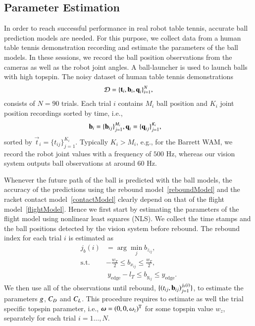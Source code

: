 \subsection{Parameter Estimation}\label{sectionEstimation}

In order to reach successful performance in real robot table tennis, accurate ball prediction models are needed. For this purpose, we collect data from a human table tennis demonstration recording and estimate the parameters of the ball models. In these sessions, we record the ball position observations from the cameras as well as the robot joint angles. A ball-launcher is used to launch balls with high topspin. The noisy dataset of human table tennis demonstrations 
%
\begin{align}
\mathcal{D} = \{\boldsymbol{\mathrm{t}}_i, \boldsymbol{\mathrm{b}}_i, \boldsymbol{\mathrm{q}}_i\}_{i=1}^{N} \label{demonstrations},
\end{align}
%
\noindent consists of $N = 90$ trials. Each trial $i$ contains $M_i$ ball position and $K_i$ joint position recordings sorted by time, i.e.,
%
\begin{align}
\boldsymbol{\mathrm{b}}_i &= \{\boldsymbol{\mathrm{b}}_{ij}\}_{j=1}^{M_i}, \boldsymbol{\mathrm{q}}_i = \{\boldsymbol{\mathrm{q}}_{ij}\}_{j=1}^{K_i},
\end{align}
%
\noindent sorted by $\vec{t}_i = \{t_{ij}\}_{j=1}^{K_i}$. Typically $K_i > M_i$, e.g., for the Barrett WAM, we record the robot joint values with a frequency of $500$ Hz, whereas our vision system outputs ball observations at around $60$ Hz.

Whenever the future path of the ball is predicted with the ball models, the accuracy of the predictions using the rebound model~\eqref{reboundModel} and the racket contact model~\eqref{contactModel} clearly depend on that of the flight model~\eqref{flightModel}. Hence we first start by estimating the parameters of the flight model using nonlinear least squares (NLS). We collect the time stamps and the ball positions detected by the vision system before rebound. The rebound index for each trial $i$ is estimated as
%
\begin{align}
j_b(i) &= \arg\min_{j} b_{z_{ij}}, \\
\textrm{s.t. \ }
& -\tfrac{w_{T}}{2} \leq b_{x_{ij}} \leq \tfrac{w_{T}}{2}, \\
& \ y_{\mathrm{edge}} - l_{T} \leq b_{y_{ij}} \leq y_{\mathrm{edge}}.
\label{bounceTimeEst}
\end{align}
%
We then use all of the observations until rebound, $\{(t_{ij},\boldsymbol{\mathrm{b}}_{ij})_{j=1}^{j_b(i)}\}$, to estimate the parameters $g$, $C_{D}$ and $C_{L}$. This procedure requires to estimate as well the trial specific topspin parameter, i.e., $\boldsymbol{\mathrm{\omega}} = (0,0,\omega_z)^{\mathrm{T}}$ for some topspin value $w_z$, separately for each trial $i = 1 \ldots, N$. %

